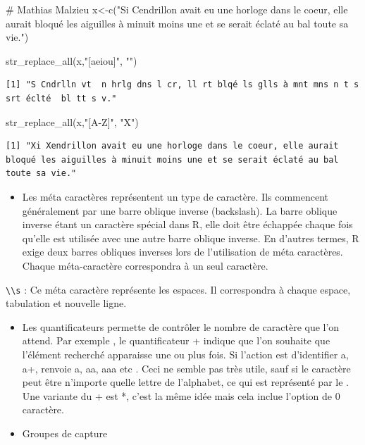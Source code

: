 \documentclass[
  letterpaper,
  DIV=11,
  numbers=noendperiod]{scrreprt}
\newenvironment{Shaded}{\begin{snugshade}}{\end{snugshade}}
\newcommand{\CommentTok}[1]{\textcolor[rgb]{0.37,0.37,0.37}{#1}}
\newcommand{\FunctionTok}[1]{\textcolor[rgb]{0.28,0.35,0.67}{#1}}
\newcommand{\NormalTok}[1]{\textcolor[rgb]{0.00,0.23,0.31}{#1}}
\newcommand{\OtherTok}[1]{\textcolor[rgb]{0.00,0.23,0.31}{#1}}
\newcommand{\StringTok}[1]{\textcolor[rgb]{0.13,0.47,0.30}{#1}}
\providecommand{\tightlist}{%
  \setlength{\itemsep}{0pt}\setlength{\parskip}{0pt}}\usepackage{longtable,booktabs,array}
\begin{document}
\begin{Shaded}
\begin{Highlighting}[]
\CommentTok{\# Mathias Malzieu}
\NormalTok{x}\OtherTok{\textless{}{-}}\FunctionTok{c}\NormalTok{(}\StringTok{"Si Cendrillon avait eu une horloge dans le coeur, elle aurait bloqué les aiguilles à minuit moins une et se serait éclaté au bal toute sa vie."}\NormalTok{)}

\FunctionTok{str\_replace\_all}\NormalTok{(x,}\StringTok{"[aeiou]"}\NormalTok{, }\StringTok{""}\NormalTok{)}
\end{Highlighting}
\end{Shaded}

\begin{verbatim}
[1] "S Cndrlln vt  n hrlg dns l cr, ll rt blqé ls glls à mnt mns n t s srt éclté  bl tt s v."
\end{verbatim}

\begin{Shaded}
\begin{Highlighting}[]
\FunctionTok{str\_replace\_all}\NormalTok{(x,}\StringTok{"[A{-}Z]"}\NormalTok{, }\StringTok{"X"}\NormalTok{)}
\end{Highlighting}
\end{Shaded}

\begin{verbatim}
[1] "Xi Xendrillon avait eu une horloge dans le coeur, elle aurait bloqué les aiguilles à minuit moins une et se serait éclaté au bal toute sa vie."
\end{verbatim}

\begin{itemize}
\tightlist
\item
  Les méta caractères représentent un type de caractère. Ils commencent
  généralement par une barre oblique inverse (backslash). La barre
  oblique inverse étant un caractère spécial dans R, elle doit être
  échappée chaque fois qu'elle est utilisée avec une autre barre oblique
  inverse. En d'autres termes, R exige deux barres obliques inverses
  lors de l'utilisation de méta caractères. Chaque méta-caractère
  correspondra à un seul caractère.
\end{itemize}

\texttt{\textbackslash{}\textbackslash{}s} : Ce méta caractère
représente les espaces. Il correspondra à chaque espace, tabulation et
nouvelle ligne.

\begin{itemize}
\item
  Les quantificateurs permette de contrôler le nombre de caractère que
  l'on attend. Par exemple , le quantificateur + indique que l'on
  souhaite que l'élément recherché apparaisse une ou plus fois. Si
  l'action est d'identifier a, a+, renvoie a, aa, aaa etc . Ceci ne
  semble pas très utile, sauf si le caractère peut être n'importe quelle
  lettre de l'alphabet, ce qui est représenté par le . Une variante du +
  est *, c'est la même idée mais cela inclue l'option de 0 caractère.
\item
  Groupes de capture
\end{itemize}
\end{document}
